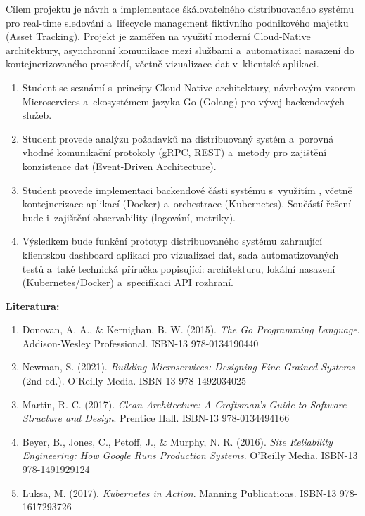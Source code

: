 \documentclass[11pt, a4paper, oneside]{article}
\begin{document}
\noindent Cílem projektu je návrh a implementace škálovatelného distribuovaného systému pro real-time sledování a~lifecycle management fiktivního podnikového majetku (Asset Tracking). Projekt je zaměřen na využití moderní Cloud-Native architektury, asynchronní komunikace mezi službami a~automatizaci nasazení do kontejnerizovaného prostředí, včetně vizualizace dat v~klientské aplikaci.

\begin{enumerate}
    \item Student se seznámí s~principy Cloud-Native architektury, návrhovým vzorem Microservices a~ekosystémem jazyka Go (Golang) pro vývoj backendových služeb.
    \item Student provede analýzu požadavků na distribuovaný systém a~porovná vhodné komunikační protokoly (gRPC, REST) a~metody pro zajištění konzistence dat (Event-Driven Architecture).
    \item Student provede implementaci backendové části systému s~využitím , včetně kontejnerizace aplikací (Docker) a~orchestrace (Kubernetes). Součástí řešení bude i~zajištění observability (logování, metriky).
    \item Výsledkem bude funkční prototyp distribuovaného systému zahrnující klientskou dashboard aplikaci pro vizualizaci dat, sada automatizovaných testů a~také technická příručka popisující: architekturu, lokální nasazení (Kubernetes/Docker) a~specifikaci API rozhraní.
\end{enumerate}

\vspace{1em}
\noindent\textbf{Literatura:}
\begin{enumerate}
    \item Donovan, A. A., \& Kernighan, B. W. (2015). \textit{The Go Programming Language}. Addison-Wesley Professional. ISBN-13 978-0134190440
    \item Newman, S. (2021). \textit{Building Microservices: Designing Fine-Grained Systems} (2nd ed.). O'Reilly Media. ISBN-13 978-1492034025
    \item Martin, R. C. (2017). \textit{Clean Architecture: A Craftsman's Guide to Software Structure and Design}. Prentice Hall. ISBN-13 978-0134494166
    \item Beyer, B., Jones, C., Petoff, J., \& Murphy, N. R. (2016). \textit{Site Reliability Engineering: How Google Runs Production Systems}. O'Reilly Media. ISBN-13 978-1491929124
    \item Luksa, M. (2017). \textit{Kubernetes in Action}. Manning Publications. ISBN-13 978-1617293726
\end{enumerate}
\end{document}
